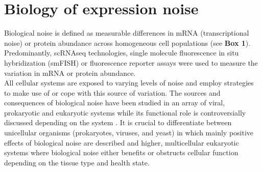 
\section{Biology of expression noise} 

Biological noise is defined as measurable differences in mRNA (transcriptional noise) or protein abundance across homogeneous cell populations (see \textbf{Box 1}).  Predominantly, scRNAseq technologies, single molecule fluorescence in situ hybridization (smFISH) or fluorescence reporter assays were used to measure the variation in mRNA or protein abundance. \\
All cellular systems are exposed to varying levels of noise and employ strategies to make use of or cope with this source of variation. The sources and consequences of biological noise have been studied in an array of viral, prokaryotic and eukaryotic systems while its functional role is controversially discussed depending on the system \citep{Raj2010, Balazsi2011, Eldar2010}. It is crucial to differentiate between unicellular organisms (prokaryotes, viruses, and yeast) in which mainly positive effects of biological noise are described and higher, multicellular eukaryotic systems where biological noise either benefits or obstructs cellular function depending on the tissue type and health state.\\\\

